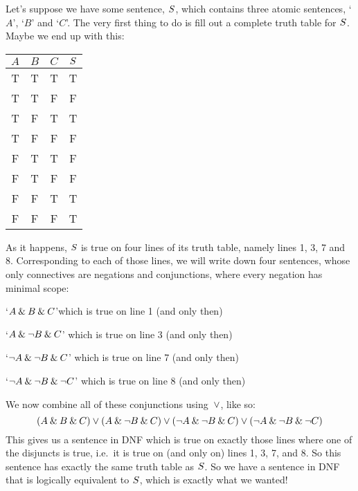Let's suppose we have some sentence, $S$, which contains three atomic sentences, `$A$', `$B$' and `$C$'. The very first thing to do is fill out a complete truth table for $S$. Maybe we end up with this:
\begin{center}
\begin{tabular}{c c c | c}
$A$ & $B$ & $C$ & $S$\\
\hline
 T & T & T & T \\
 T & T & F & F \\
 T & F & T & T \\
 T & F & F & F \\
 F & T & T & F \\
 F & T & F & F \\
 F & F & T & T \\
 F & F & F & T
\end{tabular}
\end{center}
%
%
As it happens, $S$ is true on four lines of its truth table, namely lines 1, 3, 7 and 8. Corresponding to each of those lines, we will write down four sentences, whose only connectives are negations and conjunctions, where every negation has minimal scope:
	\begin{earg}
		\item[\textbullet]  `$A \mathbin{\&} B \mathbin{\&} C$'\hfill which is true on line 1 (and only then)
		\item[\textbullet] `$A \mathbin{\&} \neg B \mathbin{\&} C$' \hfill which is true on line 3 (and only then)
		\item[\textbullet] `$\neg A \mathbin{\&} \neg B \mathbin{\&} C$' \hfill which is true on line 7 (and only then)
		\item[\textbullet] `$\neg A \mathbin{\&} \neg B \mathbin{\&} \neg C$' \hfill which is true on line 8 (and only then)
	\end{earg}
We now combine all of these conjunctions using~$\vee$, like so:
$$(A \mathbin{\&} B \mathbin{\&} C) \vee (A \mathbin{\&} \neg B \mathbin{\&} C) \vee (\neg A \mathbin{\&} \neg B \mathbin{\&} C) \vee (\neg A \mathbin{\&} \neg B \mathbin{\&} \neg C)$$
This gives us a sentence in DNF which is true on exactly those lines where one of the disjuncts is true, i.e.\ it is true on (and only on) lines 1, 3, 7, and 8. So this sentence has exactly the same truth table as $S$. So we have a sentence in DNF that is logically equivalent to $S$, which is exactly what we wanted!

